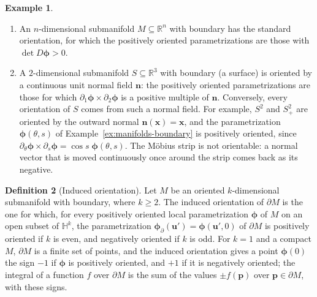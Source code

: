 \documentclass[11pt]{article}
\theoremstyle{definition}
\newtheorem{definition}{Definition}[section]
\newtheorem{example}[definition]{Example}
\theoremstyle{plain}
\theoremstyle{remark}
\begin{document}
\begin{example}\label{ex:orientations}
    \begin{enumerate}
        \item An $n$-dimensional submanifold $M \subseteq \mathbb{R}^n$ with boundary has the standard orientation, for which the positively oriented parametrizations are those with $\det D\boldsymbol{\phi} > 0$.
        \item A $2$-dimensional submanifold $S \subseteq \mathbb{R}^3$ with boundary (a surface) is oriented by a continuous unit normal field $\mathbf{n}$: the positively oriented parametrizations are those for which $\partial_1\boldsymbol{\phi} \times \partial_2\boldsymbol{\phi}$ is a positive multiple of $\mathbf{n}$. Conversely, every orientation of $S$ comes from such a normal field. For example, $S^2$ and $S^2_+$ are oriented by the outward normal $\mathbf{n}(\mathbf{x}) = \mathbf{x}$, and the parametrization $\boldsymbol{\phi}(\theta, s)$ of Example~\ref{ex:manifolds-boundary} is positively oriented, since $\partial_\theta\boldsymbol{\phi} \times \partial_s\boldsymbol{\phi} = \cos s\; \boldsymbol{\phi}(\theta, s)$. The M\"obius strip is not orientable: a normal vector that is moved continuously once around the strip comes back as its negative.
    \end{enumerate}
\end{example}

\begin{definition}[Induced orientation]\label{def:boundary-orientation}
    Let $M$ be an oriented $k$-dimensional submanifold with boundary, where $k \geq 2$. The induced orientation of $\partial M$ is the one for which, for every positively oriented local parametrization $\boldsymbol{\phi}$ of $M$ on an open subset of $\mathbb{H}^k$, the parametrization $\boldsymbol{\phi}_\partial(\mathbf{u}') = \boldsymbol{\phi}(\mathbf{u}', 0)$ of $\partial M$ is positively oriented if $k$ is even, and negatively oriented if $k$ is odd. For $k = 1$ and a compact $M$, $\partial M$ is a finite set of points, and the induced orientation gives a point $\boldsymbol{\phi}(0)$ the sign $-1$ if $\boldsymbol{\phi}$ is positively oriented, and $+1$ if it is negatively oriented; the integral of a function $f$ over $\partial M$ is the sum of the values $\pm f(\mathbf{p})$ over $\mathbf{p} \in \partial M$, with these signs.
\end{definition}
\end{document}
